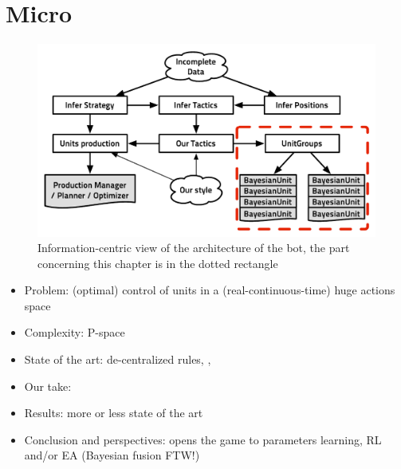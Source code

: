 \chapter{Micro}
\begin{figure}[!ht]
\begin{center}
\includegraphics[width=13cm]{images/starcraft_bbq_concept_12-04-2012_MICRO.pdf}
\end{center}
\label{fig:conceptMICRO}
\caption{Information-centric view of the architecture of the bot, the part concerning this chapter is in the dotted rectangle}
\end{figure}

\begin{itemize}
\item Problem: (optimal) control of units in a (real-continuous-time) huge actions space
\item Complexity: P-space
\item State of the art: de-centralized rules, \citep{Marthi05concurrenthierarchical}, \citep{WeberCIG10}
\item Our take: \citep{SYNNAEVE:Micro}
\item Results: more or less state of the art
\item Conclusion and perspectives: opens the game to parameters learning, RL and/or EA (Bayesian fusion FTW!)
\end{itemize}

